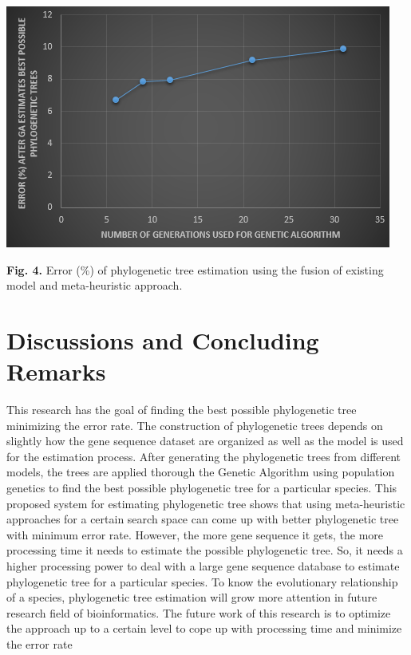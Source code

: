 \documentclass[preprint,12pt]{elsarticle}
\begin{document}
\begin{center}
\includegraphics{FIG04.PNG}

\textbf{Fig. 4.} Error (\%) of phylogenetic tree estimation using the fusion of existing model and meta-heuristic approach.
\end{center}

\section{Discussions and Concluding Remarks}
This research has the goal of finding the best possible phylogenetic tree minimizing the error rate. The construction of phylogenetic trees depends on slightly how the gene sequence dataset are organized as well as the model is used for the estimation process. After generating the phylogenetic trees from different models, the trees are applied thorough the Genetic Algorithm using population genetics to find the best possible phylogenetic tree for a particular species. This proposed system for estimating phylogenetic tree shows that using meta-heuristic approaches for a certain search space can come up with better phylogenetic tree with minimum error rate. However, the more gene sequence it gets, the more processing time it needs to estimate the possible phylogenetic tree. So, it needs a higher processing power to deal with a large gene sequence database to estimate phylogenetic tree for a particular species. To know the evolutionary relationship of a species, phylogenetic tree estimation will grow more attention in future research field of bioinformatics. The future work of this research is to optimize the approach up to a certain level to cope up with processing time and minimize the error rate
\end{document}
